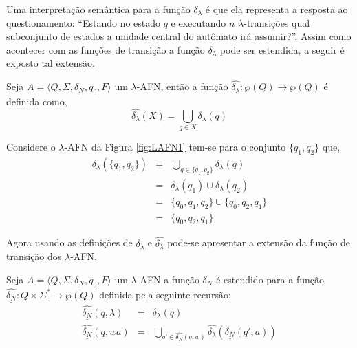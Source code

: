 Uma interpretação semântica para a função $\delta_\lambda$ é que ela representa a resposta ao questionamento: ``Estando no estado $q$ e executando $n$ $\lambda$-transições qual subconjunto de estados a unidade central do autômato irá assumir?''. Assim como acontecer com as funções de transição a função $\delta_\lambda$ pode ser estendida, a seguir é exposto tal extensão.

\begin{definition}\label{def:L-Fecho}
	Seja $A = \langle Q, \Sigma, \underline{\delta_N}, q_0, F\rangle$ um $\lambda$-AFN, então a função $\widehat{\delta_\lambda}: \wp(Q) \rightarrow \wp(Q)$ é definida como,
	\begin{equation}
		\widehat{\delta_\lambda}(X) = \bigcup_{q \in X} \delta_\lambda(q)
	\end{equation}
\end{definition} 

\begin{exem}
	Considere o $\lambda$-AFN da Figura \ref{fig:LAFN1} tem-se para o conjunto $\{q_1, q_2\}$ que,
	\begin{eqnarray*}
		\widehat{\delta_\lambda}(\{q_1, q_2\}) & = & \bigcup_{q \in \{q_1, q_2\}} \delta_\lambda(q)\\
		& = & \delta_\lambda(q_1) \cup \delta_\lambda(q_2)\\
		& = & \{q_0, q_1, q_2\} \cup \{q_0, q_2, q_1\}\\
		& = & \{q_0, q_2, q_1\}
	\end{eqnarray*}
\end{exem}

Agora usando as definições de $\delta_\lambda$ e $\widehat{\delta_\lambda}$ pode-se apresentar a extensão da função de transição dos $\lambda$-AFN.

\begin{definition}\label{def:FuncaoLDeltaNDEstendida}
	Seja $A = \langle Q, \Sigma, \underline{\delta_N}, q_0, F\rangle$  um $\lambda$-AFN a função $\underline{\delta_N}$ é estendido para a função $\widehat{\underline{\delta_N}}: Q \times \Sigma^* \rightarrow \wp(Q)$ definida pela seguinte recursão:
	\begin{eqnarray}\label{eq:FuncaoLDeltaNDEstendida}
		\widehat{\underline{\delta_N}}(q, \lambda)& = &  \delta_\lambda(q)\\
		\widehat{\underline{\delta_N}}(q, wa) & = & \bigcup_{q' \in \widehat{\underline{\delta_N}}(q, w)} \widehat{\delta_\lambda}(\underline{\delta_N}(q', a))
	\end{eqnarray}
\end{definition}

